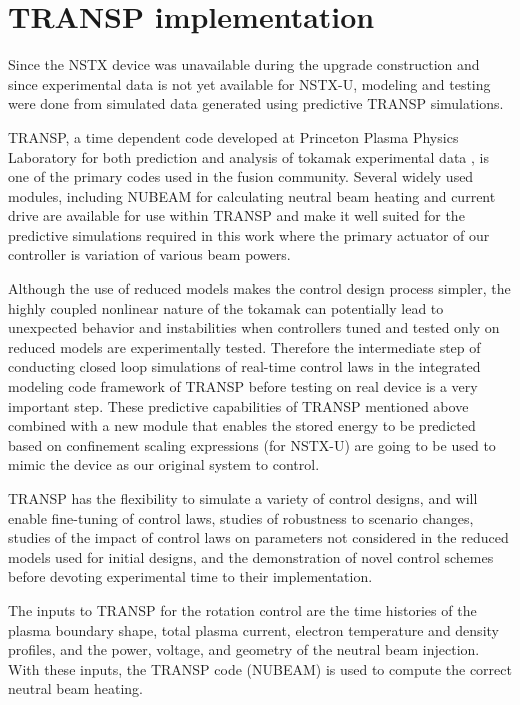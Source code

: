 \documentclass[12pt,lot, lof]{puthesis}
\begin{document}
\section{TRANSP implementation}

Since the NSTX device was unavailable during the upgrade construction and since experimental data is not yet available for NSTX-U, modeling and testing were done from simulated data generated using predictive TRANSP simulations.

TRANSP, a time dependent code developed at Princeton Plasma Physics Laboratory for both prediction and analysis of tokamak experimental data \cite{TRANSP16, Budny94}, is one of the primary codes used in the fusion community. Several widely used modules, including NUBEAM \cite{Pankin04} for calculating neutral beam heating and current drive are available for use within TRANSP and make it well suited for the predictive simulations required in this work where the primary actuator of our controller is variation of various beam powers.

Although the use of reduced models makes the control design process simpler, the highly coupled nonlinear nature of the tokamak can potentially lead to unexpected behavior and instabilities when controllers tuned and tested only on reduced models are experimentally tested. Therefore the intermediate step of conducting closed loop simulations of real-time control laws in the integrated modeling code framework of TRANSP before testing on real device is a very important step. 
These predictive capabilities of TRANSP mentioned above combined with a new module that enables the stored energy to be predicted based on confinement scaling expressions (for \mbox{NSTX-U}) are going to be used to mimic the device as our original system to control. 

TRANSP has the flexibility to simulate a variety of control designs, and will enable fine-tuning of control laws, studies of robustness to scenario changes, studies of the impact of control laws on parameters not considered in the reduced models used for initial designs, and the demonstration of novel control schemes before devoting experimental time to their implementation.

The inputs to TRANSP for the rotation control are the time histories of the plasma boundary shape, total plasma current, electron temperature and density profiles, and the power, voltage, and geometry of the neutral beam injection. With these inputs, the TRANSP code (NUBEAM) is used to compute the correct neutral beam heating.
\end{document}
